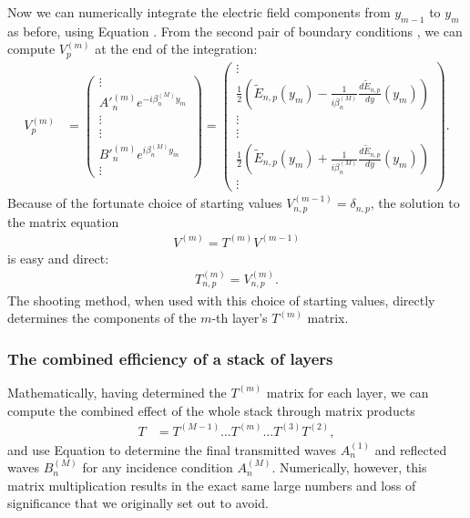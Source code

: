 Now we can numerically integrate the electric field components from $y_{m-1}$ to $y_m$ as before, using Equation .  From the second pair of boundary conditions , we can compute $V^{(m)}_p$ at the end of the integration:
\begin{align}
V^{(m)}_{p} &=   \left(\begin{array}{c}\vdots \\   A'^{(m)}_n  e^{-i \beta^{(M)}_n y_{m}}  \\ \vdots \\\hline \vdots \\  B'^{(m)}_n  e^{i \beta^{(M)}_n y_{m}}  \\ \vdots \end{array}\right)  =  \left(\begin{array}{c} \vdots \\        \frac{1}{2}\left( \tilde E_{n,p}(y_m) - \frac{1}{i\beta^{(M)}_n}\frac{d\tilde E_{n,p}}{dy}(y_m)   \right)            \\ \vdots  \\\hline \vdots \\            \frac{1}{2}\left( \tilde E_{n,p}(y_m) + \frac{1}{i\beta^{(M)}_n}\frac{d\tilde E_{n,p}}{dy}(y_m)   \right)             \\ \vdots \end{array}\right).
\end{align}
Because of the fortunate choice of starting values $V^{(m-1)}_{n,p} = \delta_{n,p}$, 
the solution to the matrix equation
\begin{align}
V^{(m)} = T^{(m)} V^{(m-1)}
\end{align}
is easy and direct:
\begin{align}
T^{(m)}_{n,p} = V^{(m)}_{n,p}.
\end{align}
The shooting method, when used with this choice of starting values, directly determines the components of the $m$-th layer's $T^{(m)}$ matrix.

\subsubsection{The combined efficiency of a stack of layers}
Mathematically, having determined the $T^{(m)}$ matrix for each layer, we can compute the combined effect of the whole stack through matrix products
\begin{align}
T &= T^{(M-1)} \ldots T^{(m)} \ldots T^{(3)} T^{(2)},
\end{align}
and use Equation  to determine the final transmitted waves $A^{(1)}_n$ and reflected waves  $B^{(M)}_n$ for any incidence condition $A_n^{(M)}$.  Numerically, however, this matrix multiplication results in the exact same large numbers and loss of significance that we originally set out to avoid.

